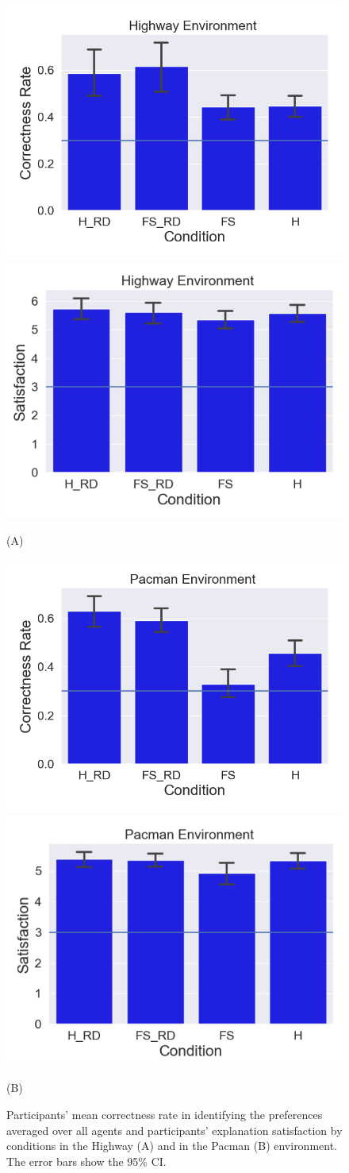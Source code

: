 \documentclass[runningheads]{llncs}
\begin{document}
\begin{figure}[t]
\begin{minipage}{0.49\linewidth}
\centering
\includegraphics[width=0.49\linewidth]{myplot_highway.png}
\includegraphics[width=0.49\linewidth]{Highway_env_satisfaction.png}

(A)
\end{minipage}
\begin{minipage}{0.49\linewidth}
\centering
\includegraphics[width=0.49\linewidth]{myplot_all.png}
\includegraphics[width=0.49\linewidth]{Pacman_env_satisfaction.png}

(B)
\end{minipage}
\vspace{-0.3cm}

\caption{Participants' mean correctness rate in identifying the preferences averaged over all agents and participants' explanation satisfaction by conditions in the Highway (A) and in the Pacman (B) environment. The error bars show the 95\% CI. }
\label{fig:results}
\vspace{-0.6cm}
\end{figure}
\end{document}
